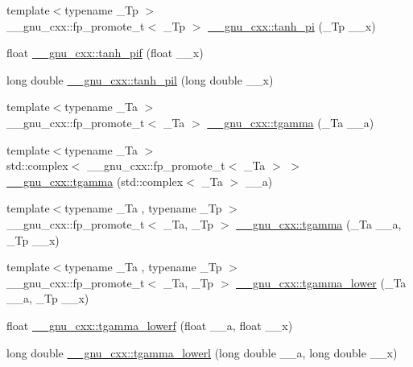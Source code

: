 \begin{DoxyCompactItemize}
\item 
{\footnotesize template$<$typename \+\_\+\+Tp $>$ }\\\+\_\+\+\_\+gnu\+\_\+cxx\+::fp\+\_\+promote\+\_\+t$<$ \+\_\+\+Tp $>$ \hyperlink{group__gnu__math__spec__func_ga8729ffd5acf3266315e9dac1b5a9b3a6}{\+\_\+\+\_\+gnu\+\_\+cxx\+::tanh\+\_\+pi} (\+\_\+\+Tp \+\_\+\+\_\+x)
\item 
float \hyperlink{group__gnu__math__spec__func_gab6cbfb582127f997ad9a198903d08889}{\+\_\+\+\_\+gnu\+\_\+cxx\+::tanh\+\_\+pif} (float \+\_\+\+\_\+x)
\item 
long double \hyperlink{group__gnu__math__spec__func_ga4bc71ee5cf3df2ba35e6504027e5c6c6}{\+\_\+\+\_\+gnu\+\_\+cxx\+::tanh\+\_\+pil} (long double \+\_\+\+\_\+x)
\item 
{\footnotesize template$<$typename \+\_\+\+Ta $>$ }\\\+\_\+\+\_\+gnu\+\_\+cxx\+::fp\+\_\+promote\+\_\+t$<$ \+\_\+\+Ta $>$ \hyperlink{group__gnu__math__spec__func_ga73a634663e4eceb1e6bcf3fc16773b7b}{\+\_\+\+\_\+gnu\+\_\+cxx\+::tgamma} (\+\_\+\+Ta \+\_\+\+\_\+a)
\item 
{\footnotesize template$<$typename \+\_\+\+Ta $>$ }\\std\+::complex$<$ \+\_\+\+\_\+gnu\+\_\+cxx\+::fp\+\_\+promote\+\_\+t$<$ \+\_\+\+Ta $>$ $>$ \hyperlink{group__gnu__math__spec__func_gab01fe5b7f1bacdafcad5746ef50af777}{\+\_\+\+\_\+gnu\+\_\+cxx\+::tgamma} (std\+::complex$<$ \+\_\+\+Ta $>$ \+\_\+\+\_\+a)
\item 
{\footnotesize template$<$typename \+\_\+\+Ta , typename \+\_\+\+Tp $>$ }\\\+\_\+\+\_\+gnu\+\_\+cxx\+::fp\+\_\+promote\+\_\+t$<$ \+\_\+\+Ta, \+\_\+\+Tp $>$ \hyperlink{group__gnu__math__spec__func_ga264207c0040cd3877fad455121da8518}{\+\_\+\+\_\+gnu\+\_\+cxx\+::tgamma} (\+\_\+\+Ta \+\_\+\+\_\+a, \+\_\+\+Tp \+\_\+\+\_\+x)
\item 
{\footnotesize template$<$typename \+\_\+\+Ta , typename \+\_\+\+Tp $>$ }\\\+\_\+\+\_\+gnu\+\_\+cxx\+::fp\+\_\+promote\+\_\+t$<$ \+\_\+\+Ta, \+\_\+\+Tp $>$ \hyperlink{group__gnu__math__spec__func_gaed107908dec8865ea48e7764f7ea88a2}{\+\_\+\+\_\+gnu\+\_\+cxx\+::tgamma\+\_\+lower} (\+\_\+\+Ta \+\_\+\+\_\+a, \+\_\+\+Tp \+\_\+\+\_\+x)
\item 
float \hyperlink{group__gnu__math__spec__func_ga8f2aabeaa29d21b19c43972efb26798c}{\+\_\+\+\_\+gnu\+\_\+cxx\+::tgamma\+\_\+lowerf} (float \+\_\+\+\_\+a, float \+\_\+\+\_\+x)
\item 
long double \hyperlink{group__gnu__math__spec__func_gad057fe49a5bf95b1550f5f0a6e60bb19}{\+\_\+\+\_\+gnu\+\_\+cxx\+::tgamma\+\_\+lowerl} (long double \+\_\+\+\_\+a, long double \+\_\+\+\_\+x)

\end{DoxyCompactItemize}
